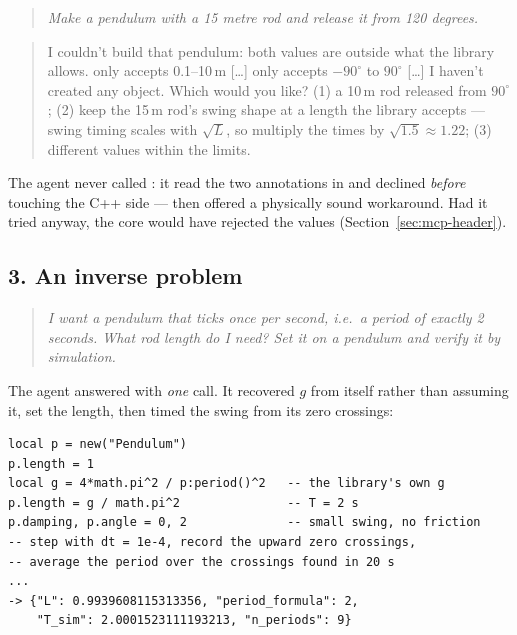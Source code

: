 \begin{quote}
\small\itshape
Make a pendulum with a 15 metre rod and release it from 120 degrees.
\end{quote}

\begin{quote}
\small
I couldn't build that pendulum: both values are outside what the library
allows.  only accepts 0.1--10\,m [\ldots]
 only accepts $-90^\circ$ to $90^\circ$ [\ldots] I haven't
created any object. Which would you like? (1) a 10\,m rod released from
$90^\circ$; (2) keep the 15\,m rod's swing shape at a length the library
accepts --- swing timing scales with $\sqrt{L}$, so multiply the times by
$\sqrt{1.5} \approx 1.22$; (3) different values within the limits.
\end{quote}

The agent never called : it read the two 
annotations in  and declined \emph{before} touching the
C++ side --- then offered a physically sound workaround. Had it tried anyway,
the core would have rejected the values (Section~\ref{sec:mcp-header}).

\subsection*{3. An inverse problem}

\begin{quote}
\small\itshape
I want a pendulum that ticks once per second, i.e.\ a period of exactly
2 seconds. What rod length do I need? Set it on a pendulum and verify it by
simulation.
\end{quote}

The agent answered with \emph{one}  call. It recovered $g$
from  itself rather than assuming it, set the length, then timed
the swing from its zero crossings:

\begin{lstlisting}[style=plain]
local p = new("Pendulum")
p.length = 1
local g = 4*math.pi^2 / p:period()^2   -- the library's own g
p.length = g / math.pi^2               -- T = 2 s
p.damping, p.angle = 0, 2              -- small swing, no friction
-- step with dt = 1e-4, record the upward zero crossings,
-- average the period over the crossings found in 20 s
...
-> {"L": 0.9939608115313356, "period_formula": 2,
    "T_sim": 2.0001523111193213, "n_periods": 9}
\end{lstlisting}

